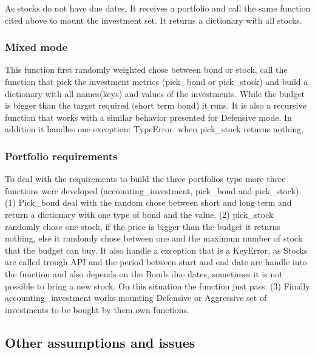 \documentclass[
  11pt,
]{article}
\begin{document}
As stocks do not have due dates, It receives a portfolio and call the same function cited above to mount the investment set. It returns a dictionary with all stocks.

\hypertarget{mixed-mode}{%
\subsubsection{Mixed mode}\label{mixed-mode}}

This function first randomly weighted chose between bond or stock, call the function that pick the investment metrics (pick\_bond or pick\_stock) and build a dictionary with all names(keys) and values of the investments. While the budget is bigger than the target required (short term bond) it runs. It is also a recursive function that works with a similar behavior presented for Defensive mode. In addition it handles one exception: TypeError. when pick\_stock returns nothing.

\hypertarget{portfolio-requirements}{%
\subsubsection{Portfolio requirements}\label{portfolio-requirements}}

To deal with the requirements to build the three portfolios type more three functions were developed (accounting\_investment, pick\_bond and pick\_stock). (1) Pick\_bond deal with the random chose between short and long term and return a dictionary with one type of bond and the value. (2) pick\_stock randomly chose one stock, if the price is bigger than the budget it returns nothing, else it randomly chose between one and the maximum number of stock that the budget can buy. It also handle a exception that is a KeyError, as Stocks are called trough API and the period between start and end date are handle into the function and also depends on the Bonds due dates, sometimes it is not possible to bring a new stock. On this situation the function just pass. (3) Finally accounting\_investment works mounting Defensive or Aggressive set of investments to be bought by them own functions.

\hypertarget{other-assumptions-and-issues}{%
\subsection{Other assumptions and issues}\label{other-assumptions-and-issues}}
\end{document}
